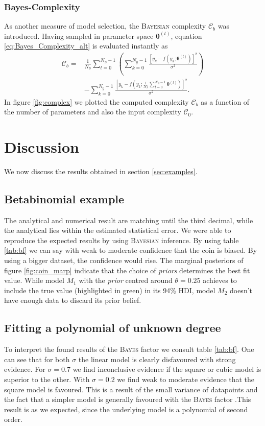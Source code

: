 \documentclass[%
 reprint,
 amsmath,amssymb,
 aps,
]{revtex4-1}
\newcommand{\btheta}{\boldsymbol{\theta}}
\begin{document}
\vspace{-1.2cm}
\subsubsection{\textbf{Bayes-Complexity}}
\noindent As another measure of model selection, the \textsc{Bayesian} complexity $\mathcal{C}_b$ was introduced. Having sampled in parameter space $\btheta^{(t)}$, equation \eqref{eq:Bayes_Complexity_alt} is evaluated instantly as \cite{wuerz} \begin{align*}\mathcal{C}_b=&\frac{1}{N_S}\sum_{t=0}^{N_S-1}\left(\sum_{k=0}^{N_y-1}\frac{[y_k-f(y_k;\btheta^{(t)})]^2}{\sigma^2}\right)\\&-\sum_{k=0}^{N_y-1}\frac{[y_k-f(y_k;\frac{1}{N_S}\sum_{t=0}^{N_S-1}\btheta^{(t)})]^2}{\sigma^2}.\end{align*}
In figure \eqref{fig:complex} we plotted the computed complexity $\mathcal{C}_b$ as a function of the number of parameters and also the input complexity $\mathcal{C}_0$.


\section{Discussion}
\noindent We now discuss the results obtained in section \eqref{sec:examples}.
\subsection{Betabinomial example}
\noindent The analytical and numerical result are matching until the third decimal, while the analytical lies within the estimated statistical error. We were able to reproduce the expected results by using \textsc{Bayesian} inference.  By using table \eqref{tab:bf} we can say with weak to moderate confidence that the coin is biased. By using a bigger dataset, the confidence would rise. The marginal posteriors of figure \eqref{fig:coin_marp} indicate that the choice of \emph{priors} determines the best fit value. While model $M_1$ with the \emph{prior} centred around  $\theta=0.25$ achieves to include the true value (highlighted in green) in its 94\% HDI, model $M_2$ doesn't have enough data to discard its prior belief. 
\subsection{Fitting a polynomial of unknown degree}
\noindent To interpret the found results of the \textsc{Bayes} factor we consult table \eqref{tab:bf}. One can see that for both $\sigma$ the linear model is clearly disfavoured with strong evidence. For $\sigma=0.7$ we find inconclusive evidence if the square or cubic model is superior to the other. With $\sigma=0.2$ we find weak to moderate evidence that the square model is favoured. This is a result of the small variance of datapoints and the fact that a simpler model is generally favoured with the \textsc{Bayes} factor \cite{sivia}.This result is as we expected, since the underlying model is a polynomial of second order. 
\end{document}
